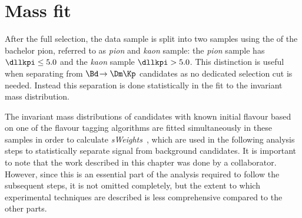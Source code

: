 \chapter{Mass fit}
\label{ch:massfit}

\linespread{1.08}\selectfont

After the full selection, the data sample is split into two samples using the \dllkpi of the bachelor pion, referred to as \emph{pion} and \emph{kaon} sample:
the \emph{pion} sample has $\dllkpi\leq5.0$ and the \emph{kaon} sample $\dllkpi>5.0$.
This distinction is useful when separating \mbox{\BdToDpi} from $\Bd\!\to\Dm\Kp$ candidates as no dedicated selection cut is needed.
Instead this separation is done statistically in the fit to the invariant mass distribution.

The invariant \Bz mass distributions of candidates with known initial flavour based on one of the flavour tagging algorithms are fitted simultaneously in these samples in order to calculate \emph{sWeights}~\cite{Pivk:2004ty}, which are used in the following analysis steps to statistically separate signal from background candidates.
It is important to note that the work described in this chapter was done by a collaborator.
However, since this is an essential part of the analysis required to follow the subsequent steps, it is not omitted completely, but the extent to which \eg experimental techniques are described is less comprehensive compared to the other parts.

